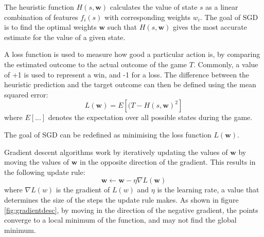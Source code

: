The heuristic function $H(s, \textbf{w})$ calculates the value of state $s$ as a linear combination of features $f_i(s)$ with corresponding weights $w_i$. The goal of SGD is to find the optimal weights $\textbf{w}$ such that $H(s, \textbf{w})$ gives the most accurate estimate for the value of a given state.

A loss function is used to measure how good a particular action is, by comparing the estimated outcome to the actual outcome of the game $T$. Commonly, a value of +1 is used to represent a win, and -1 for a loss. The difference between the heuristic prediction and the target outcome can then be defined using the mean squared error:
$$
L(\textbf{w}) = E[(T - H(s, \textbf{w})^2]
$$
where $E[...]$ denotes the expectation over all possible states during the game.


The goal of SGD can be redefined as minimising the loss function $L(\textbf{w})$.

Gradient descent algorithms work by iteratively updating the values of $\textbf{w}$ by moving the values of $\textbf{w}$ in the opposite direction of the gradient. This results in the following update rule:
$$
\textbf{w} \leftarrow \textbf{w} - \eta \nabla L(\textbf{w})
$$
where $\nabla L(w)$ is the gradient of $L(w)$ and $\eta$ is the learning rate, a value that determines the size of the steps the update rule makes. As shown in figure \ref{fig:gradientdesc}, by moving in the direction of the negative gradient, the points converge to a local minimum of the function, and may not find the global minimum.

